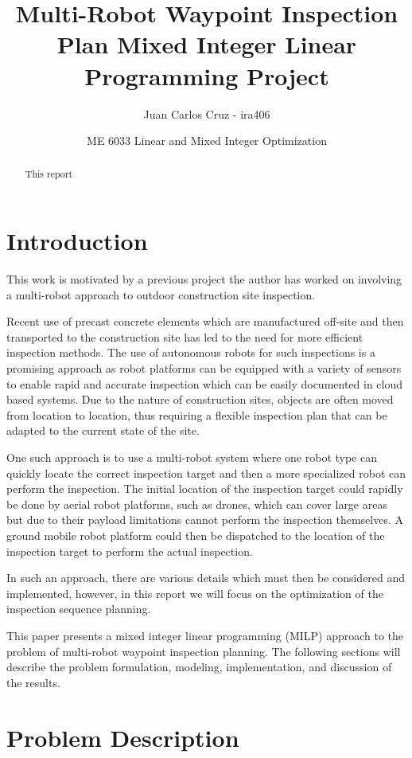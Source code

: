 \documentclass{article}
\title{Multi-Robot Waypoint Inspection Plan Mixed Integer Linear Programming Project}
\author{Juan Carlos Cruz - ira406}
\date{ME 6033 Linear and Mixed Integer Optimization}
\begin{document}
	\maketitle
	\noindent%

	\begin{abstract}
		This report
	\end{abstract}

	\section{Introduction}

		This work is motivated by a previous project the author has worked on involving a multi-robot approach to outdoor construction site inspection. 

		Recent use of precast concrete elements which are manufactured off-site and then transported to the construction site has led to the need for more efficient inspection methods. 
		The use of autonomous robots for such inspections is a promising approach as robot platforms can be equipped with a variety of sensors to enable rapid and accurate inspection which can be easily documented in cloud based systems.
		Due to the nature of construction sites, objects are often moved from location to location, thus requiring a flexible inspection plan that can be adapted to the current state of the site.

		One such approach is to use a multi-robot system where one robot type can quickly locate the correct inspection target and then a more specialized robot can perform the inspection.
		The initial location of the inspection target could rapidly be done by aerial robot platforms, such as drones, which can cover large areas but due to their payload limitations cannot perform the inspection themselves.
		A ground mobile robot platform could then be dispatched to the location of the inspection target to perform the actual inspection.

		In such an approach, there are various details which must then be considered and implemented, however, in this report we will focus on the optimization of the inspection sequence planning. 

		This paper presents a mixed integer linear programming (MILP) approach to the problem of multi-robot waypoint inspection planning.
		The following sections will describe the problem formulation, modeling, implementation, and discussion of the results.


	\section{Problem Description}
\end{document}
